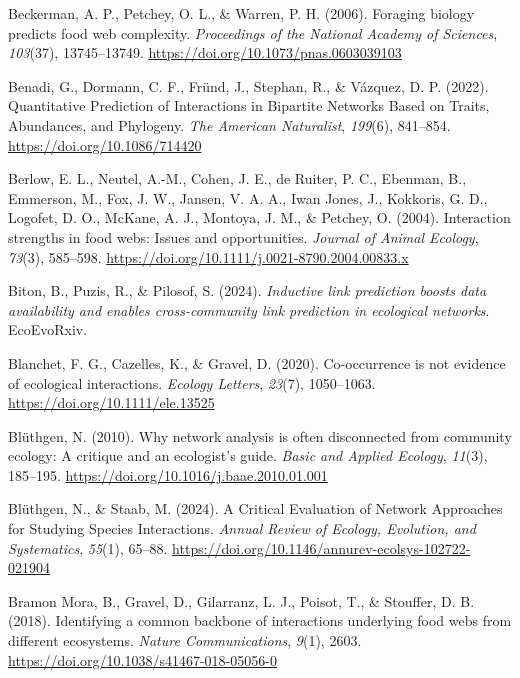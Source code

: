 \documentclass[
]{article}
\newlength{\cslhangindent}
\newenvironment{CSLReferences}[2] %
 {\begin{list}{}{%
  \setlength{\itemindent}{0pt}
  \setlength{\leftmargin}{0pt}
  \setlength{\parsep}{0pt}
  \ifodd #1
   \setlength{\leftmargin}{\cslhangindent}
   \setlength{\itemindent}{-1\cslhangindent}
  \fi
  \setlength{\itemsep}{#2\baselineskip}}}
 {\end{list}}
\begin{document}
\begin{CSLReferences}{1}{0}
Beckerman, A. P., Petchey, O. L., \& Warren, P. H. (2006). Foraging
biology predicts food web complexity. \emph{Proceedings of the National
Academy of Sciences}, \emph{103}(37), 13745--13749.
\url{https://doi.org/10.1073/pnas.0603039103}

Benadi, G., Dormann, C. F., Fründ, J., Stephan, R., \& Vázquez, D. P.
(2022). Quantitative {Prediction} of {Interactions} in {Bipartite
Networks Based} on {Traits}, {Abundances}, and {Phylogeny}. \emph{The
American Naturalist}, \emph{199}(6), 841--854.
\url{https://doi.org/10.1086/714420}

Berlow, E. L., Neutel, A.-M., Cohen, J. E., de Ruiter, P. C., Ebenman,
B., Emmerson, M., Fox, J. W., Jansen, V. A. A., Iwan Jones, J.,
Kokkoris, G. D., Logofet, D. O., McKane, A. J., Montoya, J. M., \&
Petchey, O. (2004). Interaction strengths in food webs: Issues and
opportunities. \emph{Journal of Animal Ecology}, \emph{73}(3), 585--598.
\url{https://doi.org/10.1111/j.0021-8790.2004.00833.x}

Biton, B., Puzis, R., \& Pilosof, S. (2024). \emph{Inductive link
prediction boosts data availability and enables cross-community link
prediction in ecological networks}. EcoEvoRxiv.

Blanchet, F. G., Cazelles, K., \& Gravel, D. (2020). Co-occurrence is
not evidence of ecological interactions. \emph{Ecology Letters},
\emph{23}(7), 1050--1063. \url{https://doi.org/10.1111/ele.13525}

Blüthgen, N. (2010). Why network analysis is often disconnected from
community ecology: {A} critique and an ecologist's guide. \emph{Basic
and Applied Ecology}, \emph{11}(3), 185--195.
\url{https://doi.org/10.1016/j.baae.2010.01.001}

Blüthgen, N., \& Staab, M. (2024). A {Critical Evaluation} of {Network
Approaches} for {Studying Species Interactions}. \emph{Annual Review of
Ecology, Evolution, and Systematics}, \emph{55}(1), 65--88.
\url{https://doi.org/10.1146/annurev-ecolsys-102722-021904}

Bramon Mora, B., Gravel, D., Gilarranz, L. J., Poisot, T., \& Stouffer,
D. B. (2018). Identifying a common backbone of interactions underlying
food webs from different ecosystems. \emph{Nature Communications},
\emph{9}(1), 2603. \url{https://doi.org/10.1038/s41467-018-05056-0}


\end{CSLReferences}
\end{document}
